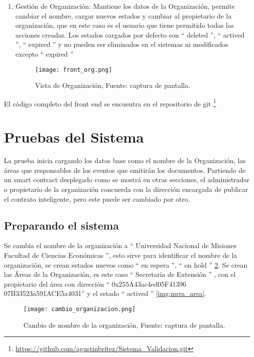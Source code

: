 \begin{enumerate}
  \item Gestión de Organización: Mantiene los datos de la Organización, permite cambiar el nombre, cargar nuevos estados y cambiar al propietario de la organización, que 
  en este caso es el usuario que tiene permitido todas las acciones creadas.
  Los estados cargados por defecto son “ deleted ”, “ actived ”, “ expired ” y no pueden ser eliminados en el sistemas  ni modificados excepto “ expired ” 

  \begin{figure}[H]
    \centering
    {\texttt{[image: front\_org.png]}}
    \caption{Vista de Organización,  Fuente: captura de pantalla. }
    \label{img:front_org}
  \end{figure}
\end{enumerate}

El código completo del front end se encuentra en el repositorio de git \footnote{\url{https://github.com/agustinbritez/Sistema_Validacion.git}} 

\section{Pruebas del Sistema}
La prueba inicia cargando los datos base como el nombre de la Organización, las áreas que responsables de los eventos que emitirán los documentos.
Partiendo de un smart contract desplegado como se mostrá en otras secciones, el administrador o propietario de la organización concuerda con la dirección encargada 
de publicar el contrato inteligente, pero este puede ser cambiado por otro.
\subsection{Preparando el sistema}

Se cambia el nombre de la organización a “ Universidad Nacional de Misiones Facultad de Ciencias Económicas ”, esto sirve para identificar el nombre de la organización, se 
crean estados nuevos como “ en espera ”, “ on hold ” \ref{img:cambio_org}.
Se crean las Áreas de la Organización, es este caso “ Secretaría de Extensión ” , con el propietario del área con dirección  “ 0x255A43ac4ed05F41396 07B33523a591ACE5a4031”
y el estado “ actived ” \ref{img:nuva_area}.
\begin{figure}[H]
  \centering
  {\texttt{[image: cambio\_organizacion.png]}}
  \caption{Cambio de nombre de la organización,  Fuente: captura de pantalla. }
  \label{img:cambio_org}
\end{figure}

